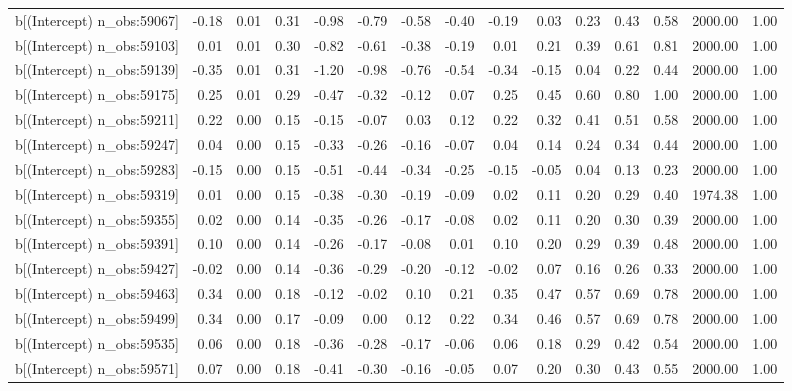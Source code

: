 \begin{table}[ht]
\begin{tabular}{rrrrrrrrrrrrrrr}
  b[(Intercept) n\_obs:59067] & -0.18 & 0.01 & 0.31 & -0.98 & -0.79 & -0.58 & -0.40 & -0.19 & 0.03 & 0.23 & 0.43 & 0.58 & 2000.00 & 1.00 \\ 
  b[(Intercept) n\_obs:59103] & 0.01 & 0.01 & 0.30 & -0.82 & -0.61 & -0.38 & -0.19 & 0.01 & 0.21 & 0.39 & 0.61 & 0.81 & 2000.00 & 1.00 \\ 
  b[(Intercept) n\_obs:59139] & -0.35 & 0.01 & 0.31 & -1.20 & -0.98 & -0.76 & -0.54 & -0.34 & -0.15 & 0.04 & 0.22 & 0.44 & 2000.00 & 1.00 \\ 
  b[(Intercept) n\_obs:59175] & 0.25 & 0.01 & 0.29 & -0.47 & -0.32 & -0.12 & 0.07 & 0.25 & 0.45 & 0.60 & 0.80 & 1.00 & 2000.00 & 1.00 \\ 
  b[(Intercept) n\_obs:59211] & 0.22 & 0.00 & 0.15 & -0.15 & -0.07 & 0.03 & 0.12 & 0.22 & 0.32 & 0.41 & 0.51 & 0.58 & 2000.00 & 1.00 \\ 
  b[(Intercept) n\_obs:59247] & 0.04 & 0.00 & 0.15 & -0.33 & -0.26 & -0.16 & -0.07 & 0.04 & 0.14 & 0.24 & 0.34 & 0.44 & 2000.00 & 1.00 \\ 
  b[(Intercept) n\_obs:59283] & -0.15 & 0.00 & 0.15 & -0.51 & -0.44 & -0.34 & -0.25 & -0.15 & -0.05 & 0.04 & 0.13 & 0.23 & 2000.00 & 1.00 \\ 
  b[(Intercept) n\_obs:59319] & 0.01 & 0.00 & 0.15 & -0.38 & -0.30 & -0.19 & -0.09 & 0.02 & 0.11 & 0.20 & 0.29 & 0.40 & 1974.38 & 1.00 \\ 
  b[(Intercept) n\_obs:59355] & 0.02 & 0.00 & 0.14 & -0.35 & -0.26 & -0.17 & -0.08 & 0.02 & 0.11 & 0.20 & 0.30 & 0.39 & 2000.00 & 1.00 \\ 
  b[(Intercept) n\_obs:59391] & 0.10 & 0.00 & 0.14 & -0.26 & -0.17 & -0.08 & 0.01 & 0.10 & 0.20 & 0.29 & 0.39 & 0.48 & 2000.00 & 1.00 \\ 
  b[(Intercept) n\_obs:59427] & -0.02 & 0.00 & 0.14 & -0.36 & -0.29 & -0.20 & -0.12 & -0.02 & 0.07 & 0.16 & 0.26 & 0.33 & 2000.00 & 1.00 \\ 
  b[(Intercept) n\_obs:59463] & 0.34 & 0.00 & 0.18 & -0.12 & -0.02 & 0.10 & 0.21 & 0.35 & 0.47 & 0.57 & 0.69 & 0.78 & 2000.00 & 1.00 \\ 
  b[(Intercept) n\_obs:59499] & 0.34 & 0.00 & 0.17 & -0.09 & 0.00 & 0.12 & 0.22 & 0.34 & 0.46 & 0.57 & 0.69 & 0.78 & 2000.00 & 1.00 \\ 
  b[(Intercept) n\_obs:59535] & 0.06 & 0.00 & 0.18 & -0.36 & -0.28 & -0.17 & -0.06 & 0.06 & 0.18 & 0.29 & 0.42 & 0.54 & 2000.00 & 1.00 \\ 
  b[(Intercept) n\_obs:59571] & 0.07 & 0.00 & 0.18 & -0.41 & -0.30 & -0.16 & -0.05 & 0.07 & 0.20 & 0.30 & 0.43 & 0.55 & 2000.00 & 1.00 \\ 

\end{tabular}
\end{table}
